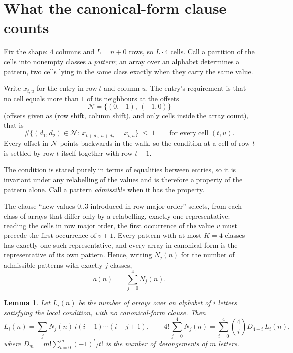 \documentclass[11pt,a4paper]{article}
\theoremstyle{plain}
\newtheorem{lemma}[theorem]{Lemma}
\theoremstyle{definition}
\begin{document}
\section{What the canonical-form clause counts}

Fix the shape: $4$ columns and $L=n+0$ rows, so $L\cdot4$ cells. Call a
partition of the cells into nonempty classes a \emph{pattern}; an array over an alphabet
determines a pattern, two cells lying in the same class exactly when they carry the same
value.

Write $x_{t,u}$ for the entry in row $t$ and column $u$. The
entry's requirement is that no cell equals more than $1$ of its neighbours at the
offsets
\[
\mathcal N=\{(0,-1),\ (-1,0)\}
\]
(offsets given as (row shift, column shift), and only cells inside the array count),
that is
\begin{equation}\label{eq:loc}
\#\bigl\{(d_1,d_2)\in\mathcal N:\ x_{t+d_1,\,u+d_2}=x_{t,u}\bigr\}\;\le\;1
\qquad\text{for every cell }(t,u).
\end{equation}
Every offset in $\mathcal N$ points backwards in the walk, so the condition at a cell of
row $t$ is settled by row $t$ itself together with row $t-1$.

The condition is stated purely in terms of equalities between entries, so it is invariant
under any relabelling of the values and is therefore a property of the pattern alone. Call a
pattern \emph{admissible} when it has the property.

The clause ``new values $0..3$ introduced in row major order'' selects, from each class
of arrays that differ only by a relabelling, exactly one representative: reading the cells in
row major order, the first occurrence of the value $v$ must precede the first occurrence of
$v+1$. Every pattern with at most $K=4$ classes has exactly one such representative, and
every array in canonical form is the representative of its own pattern. Hence, writing
$N_j(n)$ for the number of admissible patterns with exactly $j$ classes,
\begin{equation}\label{eq:apat}
a(n)\;=\;\sum_{j=0}^{4}N_j(n).
\end{equation}

\begin{lemma}\label{lem:inv}
Let $L_i(n)$ be the number of arrays over an alphabet of $i$ letters satisfying the local
condition, with no canonical-form clause. Then
\[
L_i(n)=\sum_j N_j(n)\,i(i-1)\cdots(i-j+1),
\qquad
4!\,\sum_{j=0}^{4}N_j(n)=\sum_{i=0}^{4}\binom{4}{i}D_{4-i}\,L_i(n),
\]
where $D_m=m!\sum_{t=0}^{m}(-1)^t/t!$ is the number of derangements of $m$ letters.
\end{lemma}
\end{document}
